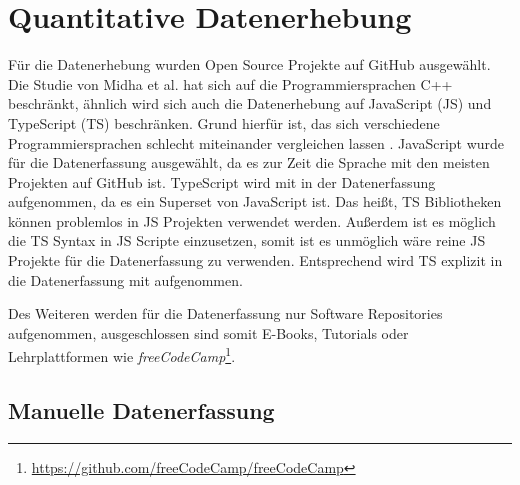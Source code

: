 \chapter{Quantitative Datenerhebung}






Für die Datenerhebung wurden  Open Source Projekte auf GitHub ausgewählt.
Die Studie von Midha et al. hat sich auf die Programmiersprachen C++ beschränkt, ähnlich wird sich
auch die Datenerhebung auf JavaScript (JS) und TypeScript (TS) beschränken. Grund hierfür ist, das
sich verschiedene Programmiersprachen schlecht miteinander vergleichen lassen
\cite{midhaFactorsAffectingSuccess2012}.
JavaScript wurde für die Datenerfassung ausgewählt, da es zur Zeit die Sprache mit den meisten
Projekten auf GitHub ist.
TypeScript wird mit in der Datenerfassung aufgenommen, da es ein Superset von JavaScript ist.
Das heißt, TS Bibliotheken können problemlos in JS Projekten verwendet werden. Außerdem ist es möglich
die TS Syntax in JS Scripte einzusetzen, somit ist es unmöglich wäre reine JS Projekte für die
Datenerfassung zu verwenden. Entsprechend wird TS explizit in die Datenerfassung mit aufgenommen.

Des Weiteren werden für die Datenerfassung nur Software Repositories aufgenommen, ausgeschlossen sind
somit E-Books, Tutorials oder Lehrplattformen wie
\textit{freeCodeCamp}\footnote{\url{https://github.com/freeCodeCamp/freeCodeCamp}}.




\section{Manuelle Datenerfassung}


